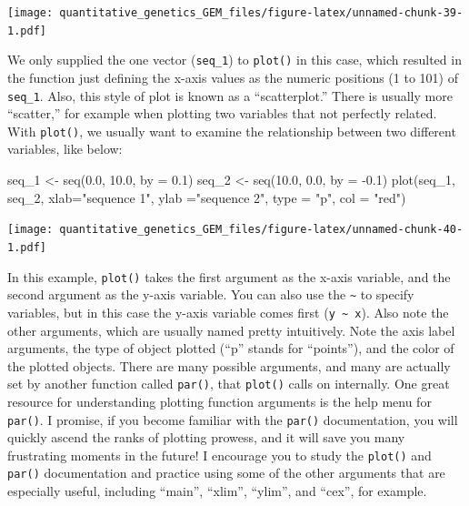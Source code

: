 \documentclass[
]{book}
\newenvironment{Shaded}{\begin{snugshade}}{\end{snugshade}}
\newcommand{\AttributeTok}[1]{\textcolor[rgb]{0.77,0.63,0.00}{#1}}
\newcommand{\FloatTok}[1]{\textcolor[rgb]{0.00,0.00,0.81}{#1}}
\newcommand{\FunctionTok}[1]{\textcolor[rgb]{0.00,0.00,0.00}{#1}}
\newcommand{\NormalTok}[1]{#1}
\newcommand{\OtherTok}[1]{\textcolor[rgb]{0.56,0.35,0.01}{#1}}
\newcommand{\SpecialCharTok}[1]{\textcolor[rgb]{0.00,0.00,0.00}{#1}}
\newcommand{\StringTok}[1]{\textcolor[rgb]{0.31,0.60,0.02}{#1}}
\begin{document}
\texttt{[image: quantitative\_genetics\_GEM\_files/figure-latex/unnamed-chunk-39-1.pdf]}

We only supplied the one vector (\texttt{seq\_1}) to \texttt{plot()} in this case, which resulted in the function just defining the x-axis values as the numeric positions (1 to 101) of \texttt{seq\_1}. Also, this style of plot is known as a ``scatterplot.'' There is usually more ``scatter,'' for example when plotting two variables that not perfectly related. With \texttt{plot()}, we usually want to examine the relationship between two different variables, like below:

\begin{Shaded}
\begin{Highlighting}[]
\NormalTok{seq\_1 }\OtherTok{\textless{}{-}} \FunctionTok{seq}\NormalTok{(}\FloatTok{0.0}\NormalTok{, }\FloatTok{10.0}\NormalTok{, }\AttributeTok{by =} \FloatTok{0.1}\NormalTok{)}
\NormalTok{seq\_2 }\OtherTok{\textless{}{-}} \FunctionTok{seq}\NormalTok{(}\FloatTok{10.0}\NormalTok{, }\FloatTok{0.0}\NormalTok{, }\AttributeTok{by =} \SpecialCharTok{{-}}\FloatTok{0.1}\NormalTok{)}
\FunctionTok{plot}\NormalTok{(seq\_1, seq\_2, }\AttributeTok{xlab=}\StringTok{"sequence 1"}\NormalTok{, }\AttributeTok{ylab =}\StringTok{"sequence 2"}\NormalTok{, }\AttributeTok{type =} \StringTok{"p"}\NormalTok{, }\AttributeTok{col =} \StringTok{"red"}\NormalTok{)}
\end{Highlighting}
\end{Shaded}

\texttt{[image: quantitative\_genetics\_GEM\_files/figure-latex/unnamed-chunk-40-1.pdf]}

In this example, \texttt{plot()} takes the first argument as the x-axis variable, and the second argument as the y-axis variable. You can also use the \texttt{\textasciitilde{}} to specify variables, but in this case the y-axis variable comes first (\texttt{y\ \textasciitilde{}\ x}). Also note the other arguments, which are usually named pretty intuitively. Note the axis label arguments, the type of object plotted (``p'' stands for ``points''), and the color of the plotted objects. There are many possible arguments, and many are actually set by another function called \texttt{par()}, that \texttt{plot()} calls on internally. One great resource for understanding plotting function arguments is the help menu for \texttt{par()}. I promise, if you become familiar with the \texttt{par()} documentation, you will quickly ascend the ranks of plotting prowess, and it will save you many frustrating moments in the future! I encourage you to study the \texttt{plot()} and \texttt{par()} documentation and practice using some of the other arguments that are especially useful, including ``main'', ``xlim'', ``ylim'', and ``cex'', for example.
\end{document}
